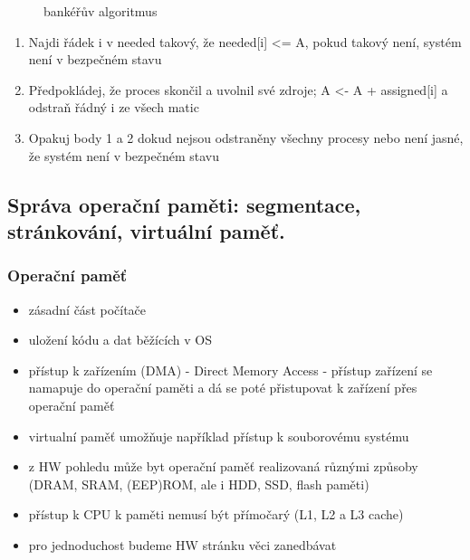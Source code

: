 \documentclass[10pt,a4paper]{article}
\begin{document}
\begin{itemize}
\begin{itemize}
\begin{itemize}
\begin{figure} [h]
			\caption{bankéřův algoritmus}	
			\end{figure}
			\begin{enumerate}
				\item Najdi řádek i v needed takový, že needed[i] <= A, pokud takový není, systém není v bezpečném stavu
				\item Předpokládej, že proces skončil a uvolnil své zdroje; A <- A + assigned[i] a odstraň řádný i ze všech matic
				\item Opakuj body 1 a 2 dokud nejsou odstraněny všechny procesy nebo není jasné, že systém není v bezpečném stavu
			\end{enumerate}
		\end{itemize}
	\end{itemize}
\end{itemize}


\subsection{ Správa operační paměti: segmentace, stránkování, virtuální paměť.}

\subsubsection{Operační paměť}
\begin{itemize}
	\item zásadní část počítače
	\item uložení kódu a dat běžících v OS
	\item přístup k zařízením (DMA) - Direct Memory Access - přístup zařízení se namapuje do
operační paměti a dá se poté přistupovat k zařízení přes operační paměť
	\item virtualní paměť umožňuje například přístup k souborovému systému
	\item z HW pohledu může byt operační paměť realizovaná různými způsoby (DRAM, SRAM,
(EEP)ROM, ale i HDD, SSD, flash paměti)
	\item přístup k CPU k paměti nemusí být přímočarý (L1, L2 a L3 cache)
	\item pro jednoduchost budeme HW stránku věci zanedbávat
\end{itemize}
\end{document}
